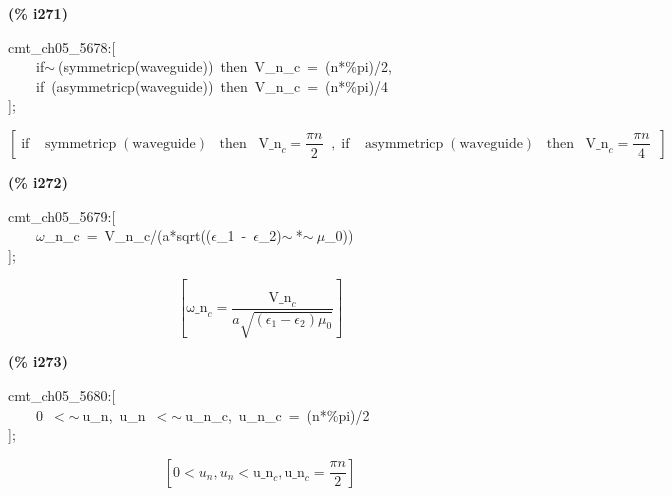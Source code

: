 \documentclass[fleqn]{article}
\begin{document}
\noindent
\begin{minipage}[t]{4.000000em}\color{red}\bfseries
(\% i271)	
\end{minipage}
\begin{minipage}[t]{\textwidth}\color{blue}
cmt\_ch05\_5678:[\\
\ \ \ \ if\ensuremath{\sim\ }(symmetricp(waveguide))\ then\ V\_n\_c\ =\ (n*\%pi)/2,\\
\ \ \ \ if\ (asymmetricp(waveguide))\ then\ V\_n\_c\ =\ (n*\%pi)/4\\
];
\end{minipage}
\[\displaystyle \tag{\% o271} 
\operatorname{[}\operatorname{if}\operatorname{ }\operatorname{symmetricp}\left( \ensuremath{\mathrm{waveguide}}\right) \operatorname{ }\operatorname{then}\operatorname{ }{{\ensuremath{\mathrm{V\_ n}}}_c}=\frac{\ensuremath{\pi}  n}{2}\operatorname{ }\operatorname{,}\operatorname{if}\operatorname{ }\operatorname{asymmetricp}\left( \ensuremath{\mathrm{waveguide}}\right) \operatorname{ }\operatorname{then}\operatorname{ }{{\ensuremath{\mathrm{V\_ n}}}_c}=\frac{\ensuremath{\pi}  n}{4}\operatorname{ }\operatorname{]}\mbox{}
\]


\noindent
\begin{minipage}[t]{4.000000em}\color{red}\bfseries
(\% i272)	
\end{minipage}
\begin{minipage}[t]{\textwidth}\color{blue}
cmt\_ch05\_5679:[\\
\ \ \ \ \ensuremath{\omega}\_n\_c\ =\ V\_n\_c/(a*sqrt((\ensuremath{\epsilon}\_1\ -\ \ensuremath{\epsilon}\_2)\ensuremath{\sim\ }*\ensuremath{\sim\ }\ensuremath{\mu}\_0))\ \\
];
\end{minipage}
\[\displaystyle \tag{\% o272} 
\left[ {{\ensuremath{\mathrm{\omega \_ n}}}_c}=\frac{{{\ensuremath{\mathrm{V\_ n}}}_c}}{a \sqrt{\left( {{\epsilon }_1}-{{\epsilon }_2}\right)  {{\mu }_0}}}\right] \mbox{}
\]


\noindent
\begin{minipage}[t]{4.000000em}\color{red}\bfseries
(\% i273)	
\end{minipage}
\begin{minipage}[t]{\textwidth}\color{blue}
cmt\_ch05\_5680:[\\
\ \ \ \ 0\ \ensuremath{<}\ensuremath{\sim\ }u\_n,\ u\_n\ \ensuremath{<}\ensuremath{\sim\ }u\_n\_c,\ u\_n\_c\ =\ (n*\%pi)/2\\
];
\end{minipage}
\[\displaystyle \tag{\% o273} 
\left[ 0\operatorname{<  }{u_n}\operatorname{,}{u_n}\operatorname{<  }{{\ensuremath{\mathrm{u\_ n}}}_c}\operatorname{,}{{\ensuremath{\mathrm{u\_ n}}}_c}=\frac{\ensuremath{\pi}  n}{2}\right] \mbox{}
\]
\end{document}
